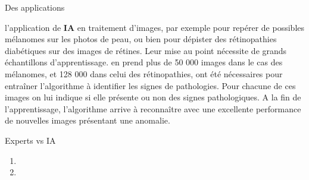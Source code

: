 \begin{frame}{Des applications}
    \begin{enumerate}[<+-|alert@+>]
        \myitem
        l'application de \textbf{IA} en traitement d'images, par exemple pour repérer de
        possibles mélanomes sur les photos de peau, ou bien pour dépister des
        rétinopathies diabétiques sur des images de rétines. Leur mise au point
        nécessite de grands échantillons d'apprentissage.
        \myitem
        en prend plus de 50 000 images dans le cas des mélanomes, et 128 000
        dans celui des rétinopathies, ont été nécessaires pour entraîner
        l'algorithme à identifier les signes de pathologies. Pour chacune
        de ces images on lui indique si elle présente ou non des signes
        pathologiques.
        \myitem
        A la fin de l'apprentissage, l'algorithme arrive à
        reconnaître avec une excellente performance de nouvelles images
            présentant une anomalie. \mybox
    \end{enumerate}
\end{frame}


\begin{frame}{Experts  vs IA}
    \begin{enumerate}[]
        \item {}

        \item {}
            \vspace{80mm}
    \end{enumerate}
\end{frame}
